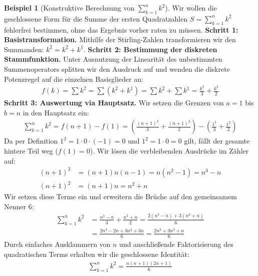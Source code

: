 \documentclass{article}
\theoremstyle{definition}
\newtheorem{bsp}[thm]{Beispiel}
\begin{document}
\begin{bsp}[Konstruktive Berechnung von $\sum_{k=1}^n k^2$]
Wir wollen die geschlossene Form für die Summe der ersten Quadratzahlen $S = \sum_{k=1}^n k^2$ fehlerfrei bestimmen, ohne das Ergebnis vorher raten zu müssen.
\newline
\textbf{Schritt 1: Basistransformation.}
Mithilfe der Stirling-Zahlen transformieren wir den Summanden: $k^2 = k^{\underline{2}} + k^{\underline{1}}$.
\newline
\textbf{Schritt 2: Bestimmung der diskreten Stammfunktion.}
Unter Ausnutzung der Linearität des unbestimmten Summenoperators splitten wir den Ausdruck auf und wenden die diskrete Potenzregel auf die einzelnen Basisglieder an:
\begin{align*}
    f(k) = \sum k^2 = \sum (k^{\underline{2}} + k^{\underline{1}}) = \sum k^{\underline{2}} + \sum k^{\underline{1}} = \frac{k^{\underline{3}}}{3} + \frac{k^{\underline{2}}}{2}
\end{align*}
\textbf{Schritt 3: Auswertung via Hauptsatz.}
Wir setzen die Grenzen von $a=1$ bis $b=n$ in den Hauptsatz ein:
\begin{align*}
    \sum_{k=1}^n k^2 = f(n+1) - f(1) = \left( \frac{(n+1)^{\underline{3}}}{3} + \frac{(n+1)^{\underline{2}}}{2} \right) - \left( \frac{1^{\underline{3}}}{3} + \frac{1^{\underline{2}}}{2} \right)
\end{align*}
Da per Definition $1^{\underline{3}} = 1 \cdot 0 \cdot (-1) = 0$ und $1^{\underline{2}} = 1 \cdot 0 = 0$ gilt, fällt der gesamte hintere Teil weg ($f(1) = 0$). Wir lösen die verbleibenden Ausdrücke im Zähler auf:
\begin{align*}
    (n+1)^{\underline{3}} &= (n+1)n(n-1) = n(n^2 - 1) = n^3 - n \\
    (n+1)^{\underline{2}} &= (n+1)n = n^2 + n
\end{align*}
Wir setzen diese Terme ein und erweitern die Brüche auf den gemeinsamem Nenner $6$:
\begin{align*}
    \sum_{k=1}^n k^2 &= \frac{n^3 - n}{3} + \frac{n^2 + n}{2} = \frac{2(n^3 - n) + 3(n^2 + n)}{6} \\
    &= \frac{2n^3 - 2n + 3n^2 + 3n}{6} = \frac{2n^3 + 3n^2 + n}{6}
\end{align*}
Durch einfaches Ausklammern von $n$ und anschließende Faktorisierung des quadratischen Terms erhalten wir die geschlossene Identität:
\begin{align*}
    \sum_{k=1}^n k^2 = \frac{n(n+1)(2n+1)}{6}
\end{align*}
\end{bsp}
\end{document}
